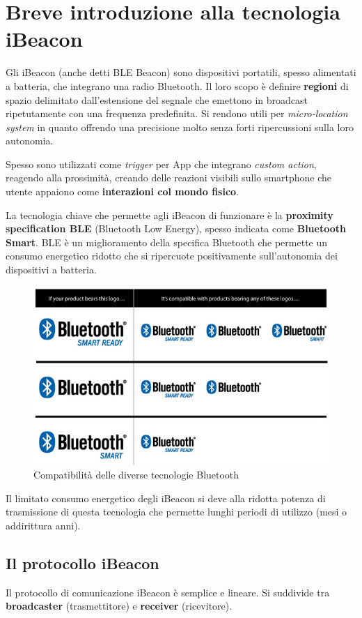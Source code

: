 \chapter{Breve introduzione alla tecnologia iBeacon}
Gli iBeacon (anche detti BLE Beacon) sono dispositivi portatili, spesso alimentati a batteria, che integrano una radio Bluetooth. Il loro scopo è definire \textbf{regioni} di spazio delimitato dall'estensione del segnale che emettono in broadcast ripetutamente con una frequenza predefinita. Si rendono utili per \textit{micro-location system} in quanto offrendo una precisione molto senza forti ripercussioni sulla loro autonomia.

Spesso sono utilizzati come \textit{trigger} per App che integrano \textit{custom action}, reagendo alla prossimità, creando delle reazioni visibili sullo smartphone che utente appaiono come \textbf{interazioni col mondo fisico}.

La tecnologia chiave che permette agli iBeacon di funzionare è la \textbf{proximity specification BLE} (Bluetooth Low Energy), spesso indicata come \textbf{Bluetooth Smart}. BLE è un miglioramento della specifica Bluetooth che permette un consumo energetico ridotto che si ripercuote positivamente sull'autonomia dei dispositivi a batteria.

\begin{figure}[!ht]
	\centering
	\includegraphics[scale=.25]{img/bt/BT.png}
	\caption{Compatibilità delle diverse tecnologie Bluetooth}
\end{figure}

Il limitato consumo energetico degli iBeacon si deve alla ridotta potenza di trasmissione di questa tecnologia che permette lunghi periodi di utilizzo (mesi o addirittura anni).

\section{Il protocollo iBeacon}
Il protocollo di comunicazione iBeacon è semplice e lineare. Si suddivide tra \textbf{broadcaster} (trasmettitore) e \textbf{receiver} (ricevitore). 

